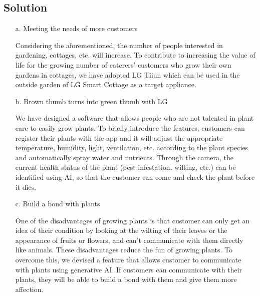 \documentclass[conference, a4paper]{IEEEtran}
\begin{document}
\subsection{Solution}
\begin{enumerate}
    \item[a.]Meeting the needs of more customers
    \item[]Considering the aforementioned, the number of people interested in gardening, cottages, etc. will increase. To contribute to increasing the value of life for the growing number of caterers' customers who grow their own gardens in cottages, we have adopted LG Tiiun which can be used in the outside garden of LG Smart Cottage as a target appliance. \\
    \item[b.]Brown thumb turns into green thumb with LG
    \item[]We have designed a software that allows people who are not talented in plant care to easily grow plants. To briefly introduce the features, customers can register their plants with the app and it will adjust the appropriate temperature, humidity, light, ventilation, etc. according to the plant species and automatically spray water and nutrients. Through the camera, the current health status of the plant (pest infestation, wilting, etc.) can be identified using AI, so that the customer can come and check the plant before it dies. \\
    \item[c.]Build a bond with plants
    \item[]One of the disadvantages of growing plants is that customer can only get an idea of their condition by looking at the wilting of their leaves or the appearance of fruits or flowers, and can't communicate with them directly like animals. These disadvantages reduce the fun of growing plants. To overcome this, we devised a feature that allows customer to communicate with plants using generative AI. If customers can communicate with their plants, they will be able to build a bond with them and give them more affection. \\
\end{enumerate}
\end{document}
